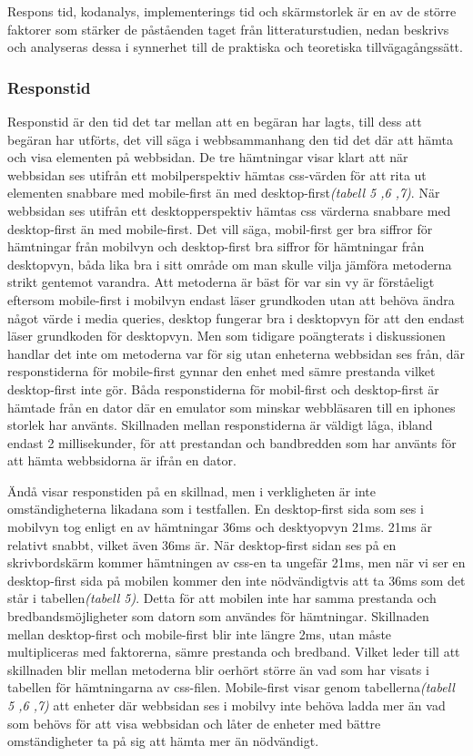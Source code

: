 \documentclass[11pt]{article}
\begin{document}
Respons tid, kodanalys, implementerings tid och skärmstorlek är en av de större faktorer som stärker de påståenden taget från litteraturstudien, nedan beskrivs och analyseras dessa i synnerhet till de praktiska och teoretiska tillvägagångssätt.

\subsubsection{Responstid}
Responstid är den tid det tar mellan att en begäran har lagts, till dess att begäran har utförts, det vill säga i webbsammanhang den tid det där att hämta och visa elementen på webbsidan. De tre hämtningar visar klart att när webbsidan ses utifrån ett mobilperspektiv hämtas css-värden för att rita ut elementen snabbare med mobile-first än med desktop-first\textit{(tabell 5 ,6 ,7)}. När webbsidan ses utifrån ett desktopperspektiv hämtas css värderna snabbare med desktop-first än med mobile-first. Det vill säga, mobil-first ger bra siffror för hämtningar från mobilvyn och desktop-first bra siffror för hämtningar från desktopvyn, båda lika bra i sitt område om man skulle vilja jämföra metoderna strikt gentemot varandra. Att metoderna är bäst för var sin vy är förståeligt eftersom mobile-first i mobilvyn endast läser grundkoden utan att behöva ändra något värde i media queries, desktop fungerar bra i desktopvyn för att den endast läser grundkoden för desktopvyn. Men som tidigare poängterats i diskussionen handlar det inte om metoderna var för sig utan enheterna webbsidan ses från, där responstiderna för mobile-first gynnar den enhet med sämre prestanda vilket desktop-first inte gör. Båda responstiderna för mobil-first och desktop-first är hämtade från en dator där en emulator som minskar webbläsaren till en iphones storlek har använts. Skillnaden mellan responstiderna är väldigt låga, ibland endast 2 millisekunder, för att prestandan och bandbredden som har använts för att hämta webbsidorna är ifrån en dator. 

Ändå visar responstiden på en skillnad, men i verkligheten är inte omständigheterna likadana som i testfallen. En desktop-first sida som ses i mobilvyn tog enligt en av hämtningar 36ms och desktyopvyn 21ms. 21ms är relativt snabbt, vilket även 36ms är. När desktop-first sidan ses på en skrivbordskärm kommer hämtningen av css-en ta ungefär 21ms, men när vi ser en desktop-first sida på mobilen kommer den inte nödvändigtvis att ta 36ms som det står i tabellen\textit{(tabell 5)}. Detta för att mobilen inte har samma prestanda och bredbandsmöjligheter som datorn som användes för hämtningar. Skillnaden mellan desktop-first och mobile-first blir inte längre 2ms, utan måste multipliceras med faktorerna, sämre prestanda och bredband. Vilket leder till att skillnaden blir mellan metoderna blir oerhört större än vad som har visats i tabellen för hämtningarna av css-filen. Mobile-first visar genom tabellerna\textit{(tabell 5 ,6 ,7)} att enheter där webbsidan ses i mobilvy inte behöva ladda mer än vad som behövs för att visa webbsidan och låter de enheter med bättre omständigheter ta på sig att hämta mer än nödvändigt.
\end{document}
